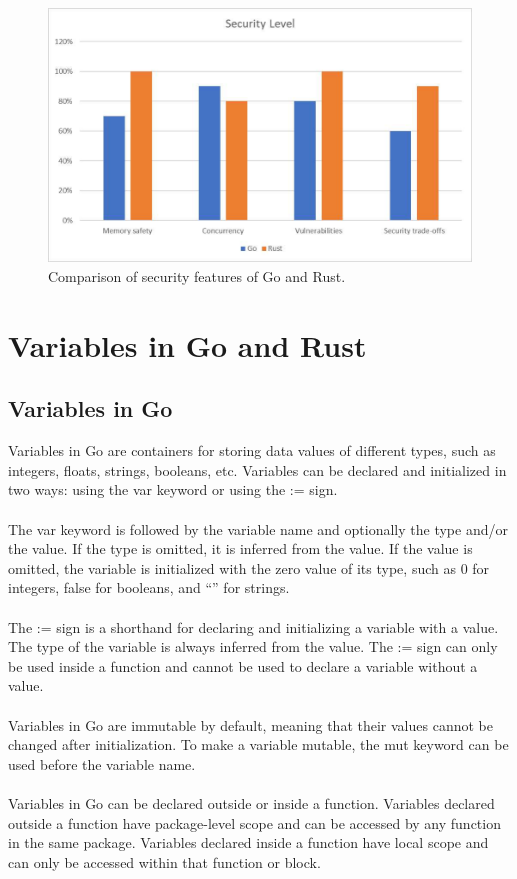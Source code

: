\documentclass{dclass}
\begin{document}
\begin{figure}[h!]
\begin{center}
\includegraphics[width=15.0cm]{security_chart}
\caption{Comparison of security features of Go and Rust.}
\label{fig1}
\end{center}\vs{-4mm}
\end{figure}

\section{Variables in Go and Rust}

\subsection{Variables in Go}

Variables in Go are containers for storing data values of different types, such as integers, floats, strings, booleans, etc. Variables can be declared and initialized in two ways: using the var keyword or using the := sign. \\\\
The var keyword is followed by the variable name and optionally the type and/or the value. If the type is omitted, it is inferred from the value. If the value is omitted, the variable is initialized with the zero value of its type, such as 0 for integers, false for booleans, and “” for strings.\\\\
The := sign is a shorthand for declaring and initializing a variable with a value. The type of the variable is always inferred from the value. The := sign can only be used inside a function and cannot be used to declare a variable without a value.\\\\
Variables in Go are immutable by default, meaning that their values cannot be changed after initialization. To make a variable mutable, the mut keyword can be used before the variable name.\\\\
Variables in Go can be declared outside or inside a function. Variables declared outside a function have package-level scope and can be accessed by any function in the same package. Variables declared inside a function have local scope and can only be accessed within that function or block.\cite{ref3}\\
\end{document}
